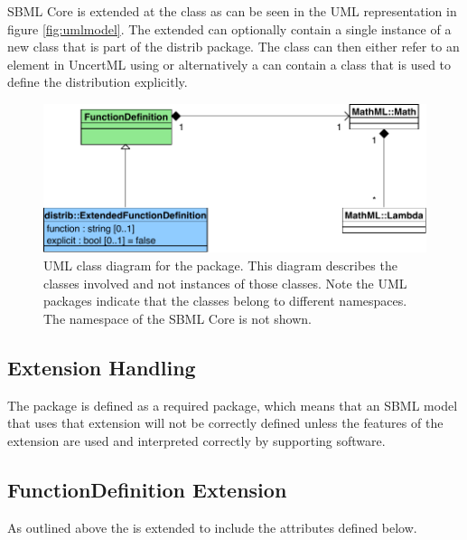 \documentclass[draftspec]{sbmlpkgspec}
\begin{document}
SBML Core is extended at the \FunctionDefinition class as can be seen
in the UML representation in figure \vref{fig:umlmodel}. The extended
\FunctionDefinition can optionally contain a single instance of a new
class  that is part of the distrib package. The  class can
then either refer to an element in UncertML using or alternatively a
 can contain a \mmath class that is used to define the
distribution explicitly.

\begin{figure}[htb]
\includegraphics[width=1.0\linewidth]{DistribUMLModel.pdf}
\caption{UML class diagram for the \distrib package. This diagram describes the
  classes involved and not instances of those classes. Note the UML packages
  indicate that the classes belong to different namespaces. The
  namespace of the SBML Core is not shown.}
\label{fig:umlmodel}
\end{figure}

\subsection{Extension Handling}

The \distrib package is defined as a required package, which means
that an SBML model that uses that extension will not be correctly
defined unless the features of the extension are used and interpreted
correctly by supporting software.

\subsection{FunctionDefinition Extension}

As outlined above the \FunctionDefinition is extended to include the attributes defined below.

\paragraph{}
\end{document}
